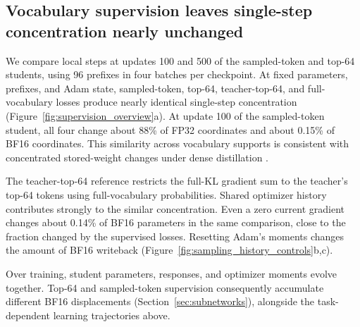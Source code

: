 



\subsection{Vocabulary supervision leaves single-step concentration nearly unchanged}

We compare local steps at updates 100 and 500 of the sampled-token and top-64 students, using 96 prefixes in four batches per checkpoint. At fixed parameters, prefixes, and Adam state, sampled-token, top-64, teacher-top-64, and full-vocabulary losses produce nearly identical single-step concentration (Figure~\ref{fig:supervision_overview}a). At update 100 of the sampled-token student, all four change about 88\% of FP32 coordinates and about 0.15\% of BF16 coordinates. This similarity across vocabulary supports is consistent with concentrated stored-weight changes under dense distillation \citep{yu2026denseupdates}.

The teacher-top-64 reference restricts the full-KL gradient sum to the teacher's top-64 tokens using full-vocabulary probabilities. Shared optimizer history contributes strongly to the similar concentration. Even a zero current gradient changes about 0.14\% of BF16 parameters in the same comparison, close to the fraction changed by the supervised losses. Resetting Adam's moments changes the amount of BF16 writeback (Figure~\ref{fig:sampling_history_controls}b,c).



Over training, student parameters, responses, and optimizer moments evolve together. Top-64 and sampled-token supervision consequently accumulate different BF16 displacements (Section~\ref{sec:subnetworks}), alongside the task-dependent learning trajectories above.

\FloatBarrier
